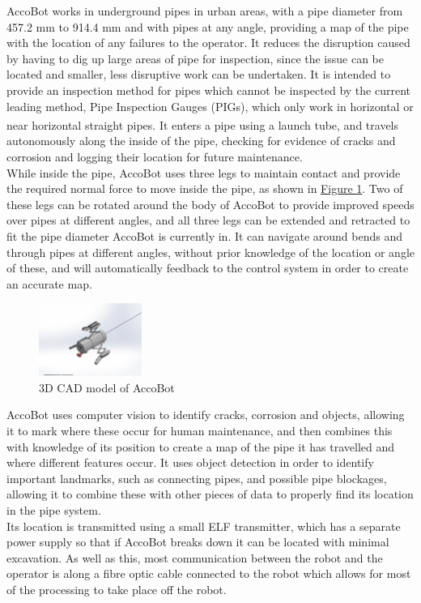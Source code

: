\documentclass[11pt]{article}		%
\newcommand{\supercite}[1]{\textsuperscript{\cite{#1}}}		%
\newcommand{\figref}[1]{\hyperref[#1]{Figure \ref*{#1}}}    %
\begin{document}
		AccoBot works in underground pipes in urban areas, with a pipe diameter from 457.2 mm to 914.4 mm and with pipes at any angle, providing a map of the pipe with the location of any failures to the operator. %
		It reduces the disruption caused by having to dig up large areas of pipe for inspection, since the issue can be located and smaller, less disruptive work can be undertaken.
		It is intended to provide an inspection method for pipes which cannot be inspected by the current leading method, Pipe Inspection Gauges (PIGs), which only work in horizontal or near horizontal straight pipes\supercite{mills2017advances}.
		It enters a pipe using a launch tube, and travels autonomously along the inside of the pipe, checking for evidence of cracks and corrosion and logging their location for future maintenance.
		\\
		While inside the pipe, AccoBot uses three legs to maintain contact and provide the required normal force to move inside the pipe, as shown in \figref{3DSketch}.
		Two of these legs can be rotated around the body of AccoBot to provide improved speeds over pipes at different angles, and all three legs can be extended and retracted to fit the pipe diameter AccoBot is currently in.
		It can navigate around bends and through pipes at different angles, without prior knowledge of the location or angle of these, and will automatically feedback to the control system in order to create an accurate map.
		\begin{figure}[h]
			\centering
			\includegraphics[trim={6cm 2cm 7cm 4cm},clip,width=0.3\textwidth]{overviewCAD}
			\caption{3D CAD model of AccoBot}
			\label{3DSketch}
		\end{figure}
		AccoBot uses computer vision to identify cracks, corrosion and objects, allowing it to mark where these occur for human maintenance, and then combines this with knowledge of its position to create a map of the pipe it has travelled and where different features occur.
		It uses object detection in order to identify important landmarks, such as connecting pipes, and possible pipe blockages, allowing it to combine these with other pieces of data to properly find its location in the pipe system.
		\\
		Its location is transmitted using a small ELF transmitter, which has a separate power supply so that if AccoBot breaks down it can be located with minimal excavation.
		As well as this, most communication between the robot and the operator is along a fibre optic cable connected to the robot which allows for most of the processing to take place off the robot.
	
\end{document}
